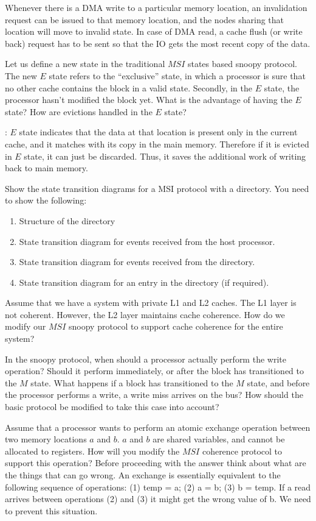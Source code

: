 \begin{ExerciseList}
\Answer
Whenever there is a DMA write to a particular memory location, 
an invalidation request can be issued to that memory location,
and the nodes sharing that location will move to invalid state.
 In case of DMA read, a cache flush (or write back) request has 
to be sent so that the IO gets the most recent copy of the data.

\Exercise
Let us define a new state in the traditional $MSI$ states based snoopy protocol.
The new $E$ state refers to the
``exclusive'' state, in which a processor is sure that no other cache contains the block
in a valid state. Secondly, in the $E$ state, the processor hasn't modified the block yet.
What is the advantage of having the $E$ state? How are evictions handled in the $E$ state? 


\Answer:
$E$ state indicates that the data at that location is present only in the
current cache, and it matches with its copy in the main memory. Therefore if it
is evicted in $E$ state, it can just be discarded. Thus, it saves the
additional
work of writing back to main memory.
 

\Exercise
Show the state transition diagrams for a MSI protocol with a directory. You need to show the following:
\begin{enumerate}
	\item Structure of the directory
	\item State transition diagram for events received from the host processor.
	\item State transition diagram for events received from the directory.
	\item State transition diagram for an entry in the directory (if required).
\end{enumerate}

\Exercise
Assume that we have a system with private L1 and L2 caches. The L1 layer is not coherent. However, the L2 layer
maintains cache coherence. How do we modify our $MSI$
snoopy protocol to support cache coherence for the entire system?

\Exercise
In the snoopy protocol, when should a processor actually perform the write operation? Should it perform immediately, or
after the block has transitioned to the $M$ state. What happens if a block has transitioned to the $M$ state, and before the
processor performs a write, a write miss arrives on the bus? How should the basic protocol be modified to take this case
into account?

\Exercise[difficulty=1]
Assume that a processor wants to perform an atomic exchange operation between two memory locations $a$ and
$b$. $a$ and $b$ are
shared variables, and cannot be allocated to registers. How will you modify the $MSI$ coherence protocol to support this
operation? Before proceeding with the answer think about what are the things that can go wrong. An exchange is
essentially equivalent to the following sequence of operations: (1) temp = a; (2) a = b; (3) b = temp. If a read arrives
between operations (2) and (3) it might get the wrong value of b. We need to prevent this situation.


\end{ExerciseList}
